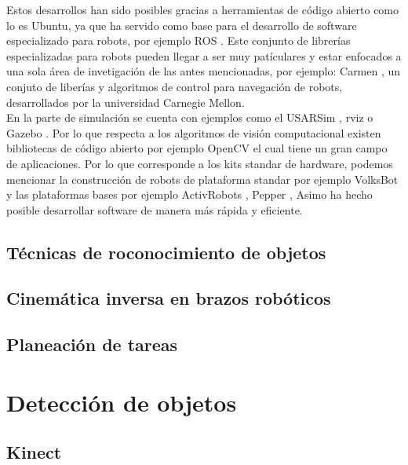 \documentclass[a4paper, openright, 12pt]{report}
\begin{document}
		Estos desarrollos han sido posibles gracias a herramientas de código abierto como lo es Ubuntu, ya que ha servido como base para el desarrollo de software especializado para robots, por ejemplo ROS \cite{rosEpage}. Este conjunto de librerías especializadas para robots pueden llegar a ser muy patículares y estar enfocados a una sola área de invetigación de las antes mencionadas, por ejemplo: Carmen \cite{carnegieMellon}, un conjuto de liberías y algoritmos de control para navegación de robots, desarrollados por la universidad Carnegie Mellon\cite{cMellonEpage}.\\

		En la parte de simulación se cuenta con ejemplos como el USARSim \cite{balakirsky2006}, rviz \cite{rVizEpage} o Gazebo \cite{gazeboEpage}. Por lo que respecta a los algoritmos de visión computacional existen bibliotecas de código abierto por ejemplo OpenCV \cite{openCV} el cual tiene un gran campo de aplicaciones\cite{bradski2000}. Por lo que corresponde a los kits standar de hardware, podemos mencionar la construcción de robots de plataforma standar por ejemplo VolksBot \cite{wisspeintner2007} y las plataformas bases por ejemplo ActivRobots \cite{ActivRobots}, Pepper \cite{pepperEpage}, Asimo \cite{asimoEpage} ha hecho posible desarrollar software de manera más rápida y eficiente.\\

	\section{Técnicas de roconocimiento de objetos}



	\section{Cinemática inversa en brazos robóticos}



	\section{Planeación de tareas}



\chapter{Detección de objetos}
	\section{Kinect}
\end{document}
